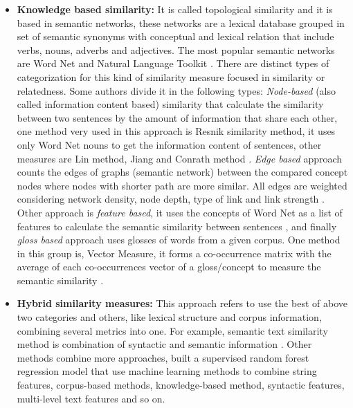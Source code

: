 \documentclass[12pt]{report}
\begin{document}
\begin{itemize}[nolistsep]
	\item \textbf{Knowledge based similarity:} It is called topological similarity and it is based in semantic networks, these networks are a lexical database grouped in set of semantic synonyms with conceptual and lexical relation that include verbs, nouns, adverbs and adjectives. The most popular semantic networks are Word Net and Natural Language Toolkit \cite{Gomaa2013} \cite{Pradhan2015} \cite{Majumder2016}. There are distinct types of categorization for this kind of similarity measure focused in similarity or relatedness. Some authors divide it in the following types: \textit{Node-based} (also called information content based) similarity that calculate the similarity between two sentences by the amount of information that share each other, one method very used in this approach is Resnik similarity method, it uses only Word Net nouns to get the information content of sentences, other measures are Lin method, Jiang and Conrath method \cite{Majumder2016} \cite{Zhang2015} \cite{Pradhan2015}. \textit{Edge based} approach counts the edges of graphs (semantic network) between the compared concept nodes where nodes with shorter path are more similar. All edges are weighted considering network density, node depth, type of link and link strength \cite{Majumder2016}  \cite{Zhang2015}. Other approach is \textit{feature based}, it uses the concepts of Word Net as a list of features to calculate the semantic similarity between sentences \cite{Zhang2015}, and finally \textit{gloss based} approach uses glosses of words from a given corpus. One method in this group is, Vector Measure, it forms a co-occurrence matrix with the average of each co-occurrences vector of a gloss/concept to measure the semantic similarity \cite{Pradhan2015}  \cite{Zhang2015}.
	
	\item \textbf{Hybrid similarity measures:} This approach refers to use the best of above two categories and others, like lexical structure and corpus information, combining several metrics into one. For example, semantic text similarity method is combination of syntactic and semantic information \cite{Zhang2015} \cite{Gomaa2013}. Other methods combine more approaches, \cite{Zhu2014} built a supervised random forest regression model that use machine learning methods to combine string features, corpus-based methods, knowledge-based method, syntactic features, multi-level text features and so on.
	
\end{itemize}
\end{document}
